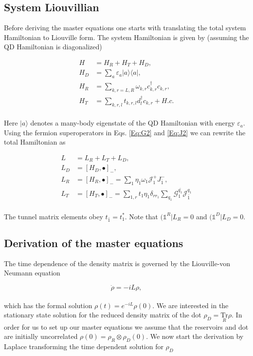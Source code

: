 \documentclass{article}
\newcommand{\oph}[2]{\ensuremath{|#1\rangle\langle#2|}}
\newcommand{\ket}[1]{\ensuremath{|#1\rangle}}
\newcommand{\bral}[1]{\ensuremath{( #1 |}}
\newcommand{\G}{\ensuremath{\mathcal{G}}}
\newcommand{\J}{\ensuremath{\mathcal{J}}}
\newcommand{\Tru}[1]{\ensuremath{\underset{#1}{\text{Tr}}}}
\begin{document}
\subsection{ System Liouvillian}
Before deriving the master equations one starts with translating the total system Hamiltonian to Liouville form. The system Hamiltonian is given by (assuming the QD Hamiltonian is diagonalized)

\begin{align}
	H &= H_R + H_T + H_D, \\
	H_D &= \sum_{a}\varepsilon_a \oph{a}{a} , \\
	H_R &= \sum_{k,r=L,R}\omega_{k,r}c^\dagger_{k,r}c_{k,r}, \\
	H_T &= \sum_{k,r,l} t_{k,r,l}d^\dagger_l c_{k,r} + H.c.
     \label{Eq:Hamiltonian}
\end{align}
\\
Here $\ket{a}$ denotes a many-body eigenstate of the QD Hamiltonian with energy $\varepsilon_a$. Using the fermion superoperators in Eqs. \ref{Eq:G2} and \ref{Eq:J2} we can rewrite the total Hamiltonian as

\begin{align}
	L &= L_R + L_T + L_D, \\
	L_D &= [H_D, \bullet]_-, \\
	L_R &= [H_R, \bullet]_-= \sum_1 \eta_1\omega_1\J^+_1J^-_{\bar{1}}, \\
	L_T &= [H_T, \bullet]_-=\sum_{1,r}t_{1}\eta_1\delta_{rr_1}\sum_{q_1}\G^{\bar{q_1}}_{1}\J^{q_1}_{\bar{1} }
\end{align}
\\
The tunnel matrix elements obey $t_{\bar{1}}=t_1^*$. Note  that $\bral{\mathbb{1}^R}L_R=0$ and $\bral{\mathbb{1}^D}L_D=0$.
\subsection{ Derivation of the master equations}

The time dependence of the density matrix is governed by the Liouville-von Neumann equation

\begin{equation}
    \dot{\rho} = -iL\rho,
\end{equation}
\\
which has the formal solution $\rho(t) = e^{-iL}\rho(0)$. We are interested in the stationary state solution for the reduced density matrix of the dot $\rho_D=\Tru{R}\rho$. In order for us to set up our master equations we assume that the reservoirs and dot are initially uncorrelated $\rho(0)=\rho_R\otimes\rho_D(0)$. We now start the derivation by Laplace transforming the time dependent solution for $\rho_D$
\end{document}
